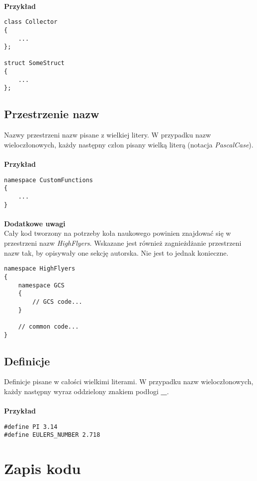 \documentclass[titlepage]{article}
\begin{document}
\paragraph{}
\textbf{Przykład}
\begin{lstlisting}
class Collector
{
	...
};

struct SomeStruct
{
	...
};
\end{lstlisting}
\subsection{Przestrzenie nazw}
Nazwy przestrzeni nazw pisane z wielkiej litery. W przypadku nazw wieloczłonowych, każdy następny człon pisany wielką literą (notacja \textit{PascalCase}).
\paragraph{}
\textbf{Przykład}
\begin{lstlisting}
namespace CustomFunctions
{
	...
}
\end{lstlisting}
\paragraph{}
\textbf{Dodatkowe uwagi} \\
Cały kod tworzony na potrzeby koła naukowego powinien znajdować się w przestrzeni nazw \textit{HighFlyers}. Wskazane jest również zagnieżdżanie przestrzeni nazw tak, by opisywały one sekcję autorska. Nie jest to jednak konieczne.
\begin{lstlisting}
namespace HighFlyers
{
	namespace GCS
	{
		// GCS code...
	}

	// common code...
}
\end{lstlisting}
\subsection{Definicje}
Definicje pisane w całości wielkimi literami. W przypadku nazw wieloczłonowych, każdy następny wyraz oddzielony znakiem podłogi \textbf{\_}.
\paragraph{}
\textbf{Przykład}
\begin{lstlisting}
#define PI 3.14
#define EULERS_NUMBER 2.718
\end{lstlisting}

\section{Zapis kodu}
\end{document}
